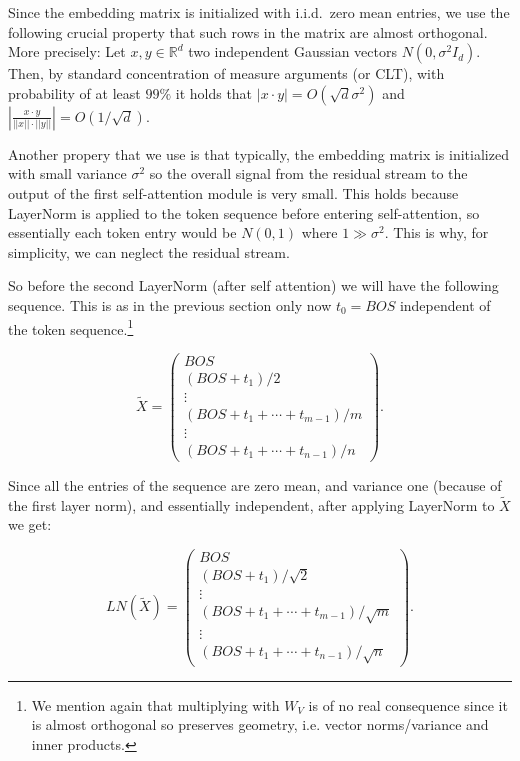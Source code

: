 \documentclass{article}
\theoremstyle{plain}
\theoremstyle{definition}
\theoremstyle{remark}
\begin{document}
Since the embedding matrix is initialized with i.i.d.\ zero mean entries, we use the following  crucial property that such rows in the matrix are almost orthogonal. More precisely: Let $x,y\in \mathbb{R}^d$ two independent Gaussian vectors $ N(0,\sigma^2 I_d) $. Then, by standard concentration of measure arguments (or CLT),  with probability of at least $99\%$ it holds that $|x\cdot y| = O(\sqrt{d}\sigma^2)$ and $|\frac{x\cdot y}{||x||\cdot ||y||}|=O( 1/\sqrt{d})$.

Another propery that we use is that typically, the embedding matrix is initialized with small variance $\sigma^2$ so the overall signal from the residual stream to the output of the first self-attention module is very small. This holds because LayerNorm is applied to  the token sequence before entering  self-attention, so essentially each token entry would be $N(0,1)$ where $1\gg \sigma^2$. This is why, for simplicity, we can neglect the residual stream.

So before the second LayerNorm (after self attention) we will have the following sequence. This is as in the previous section only now $t_0=BOS$  independent of the token sequence.\footnote{We mention again that multiplying with $W_V$ is of no real consequence since it is almost orthogonal so preserves geometry, i.e. vector norms/variance and inner products.}

\[
\tilde{X} =
\begin{pmatrix}
BOS \\
(BOS + t_1)/2 \\
\vdots \\
(BOS + t_1 + \cdots + t_{m-1})/m \\
\vdots \\
(BOS + t_1 + \cdots + t_{n-1})/n
\end{pmatrix}.
\]

Since all the entries of the sequence are zero mean, and variance one (because of the first layer norm), and essentially independent,   after applying LayerNorm to $\tilde{X}$ we get:


\[
LN(\tilde{X}) =
\begin{pmatrix}
BOS \\
(BOS + t_1)/\sqrt{2} \\
\vdots \\
(BOS + t_1 + \cdots + t_{m-1})/\sqrt{m} \\
\vdots \\
(BOS + t_1 + \cdots + t_{n-1})/\sqrt{n}
\end{pmatrix}.
\]
\end{document}

